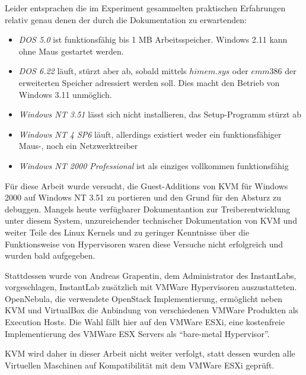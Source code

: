 	Leider entsprachen die im Experiment gesammelten praktischen Erfahrungen relativ genau denen der durch die Dokumentation zu erwartenden:
	\begin{itemize}
		\item \emph{DOS 5.0} ist funktionsfähig bis 1 MB Arbeitsspeicher. Windows 2.11 kann ohne Maus gestartet werden.
		\item \emph{DOS 6.22} läuft, stürzt aber ab, sobald mittels $himem.sys$ oder $emm386$ der erweiterten Speicher adressiert werden soll. Dies macht den Betrieb von Windows 3.11 unmöglich.
		\item \emph{Windows NT 3.51} lässt sich nicht installieren, das Setup-Programm stürzt ab
		\item \emph{Windows NT 4 SP6} läuft, allerdings existiert weder ein funktionsfähiger Maus-, noch ein Netzwerktreiber
		\item \emph{Windows NT 2000 Professional} ist als einziges vollkommen funktionsfähig
	\end{itemize}


	Für diese Arbeit wurde versucht, die Guest-Additions von KVM für Windows 2000 auf Windows NT 3.51 zu portieren und den Grund für den Absturz zu debuggen.
	Mangels heute verfügbarer Dokumentantion zur Treiberentwicklung unter diesem System, unzureichender technischer Dokumentation von KVM und weiter Teile des Linux Kernels und zu geringer Kenntnisse über die Funktionsweise von Hypervisoren waren diese Versuche nicht erfolgreich und wurden bald aufgegeben. 

	Stattdessen wurde von Andreas Grapentin, dem Administrator des InstantLabs, vorgeschlagen, InstantLab zusätzlich mit VMWare Hypervisoren auszustatteten.
	OpenNebula, die verwendete OpenStack Implementierung, ermöglicht neben KVM und VirtualBox die Anbindung von verschiedenen VMWare Produkten als Execution Hosts.
	Die Wahl fällt hier auf den VMWare ESXi, eine kostenfreie Implementierung des VMWare ESX Servers als "`bare-metal Hypervisor"'. 

	KVM wird daher in dieser Arbeit nicht weiter verfolgt, statt dessen wurden alle Virtuellen Maschinen auf Kompatibilität mit dem VMWare ESXi geprüft.

